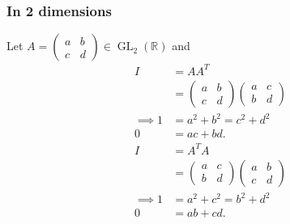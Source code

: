 \subsubsection{In 2 dimensions}
Let $A = \begin{pmatrix}a & b \\c & d\end{pmatrix} \in \operatorname{GL}_2(\mathbb{R})$ and
\begin{align*}
    I &= A A^T \\
    &= \begin{pmatrix}a & b \\c & d\end{pmatrix} \begin{pmatrix}a & c \\b & d\end{pmatrix} \\
    \implies 1 &= a^2 + b^2 = c^2 + d^2 \\
    0 &= ac + bd. \\
    I &= A^T A \\
    &= \begin{pmatrix}a & c \\b & d\end{pmatrix}  \begin{pmatrix}a & b \\c & d\end{pmatrix} \\
    \implies 1 &= a^2 + c^2 = b^2 + d^2 \\
    0 &= ab + cd. \\
\end{align*}

